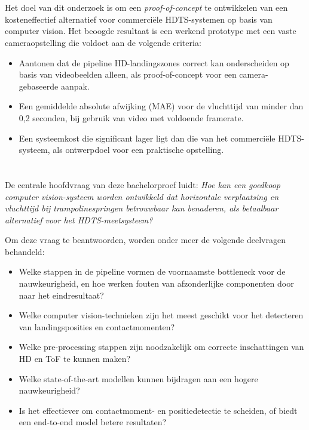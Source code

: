\section{}%
\label{sec:onderzoeksdoelstelling}

Het doel van dit onderzoek is om een \textit{proof-of-concept} te ontwikkelen van een kosteneffectief alternatief voor commerci{\"e}le HDTS-systemen op basis van computer vision. Het beoogde resultaat is een werkend prototype met een vaste cameraopstelling die voldoet aan de volgende criteria:
\begin{itemize}
    \item Aantonen dat de pipeline HD-landingszones correct kan onderscheiden op basis van videobeelden alleen, als proof-of-concept voor een camera-gebaseerde aanpak.
    \item Een gemiddelde absolute afwijking (MAE) voor de vluchttijd van minder dan 0,2 seconden, bij gebruik van video met voldoende framerate.
    \item Een systeemkost die significant lager ligt dan die van het commerci{\"e}le HDTS-systeem, als ontwerpdoel voor een praktische opstelling.
\end{itemize}

\section{}%
\label{sec:onderzoeksvraag}

De centrale hoofdvraag van deze bachelorproef luidt: 
\textit{Hoe kan een goedkoop computer vision-systeem worden ontwikkeld dat horizontale verplaatsing en vluchttijd bij trampolinespringen betrouwbaar kan benaderen, als betaalbaar alternatief voor het HDTS-meetsysteem?}

Om deze vraag te beantwoorden, worden onder meer de volgende deelvragen behandeld:
\begin{itemize}
    \item Welke stappen in de pipeline vormen de voornaamste bottleneck voor de nauwkeurigheid, en hoe werken fouten van afzonderlijke componenten door naar het eindresultaat?
    \item Welke computer vision-technieken zijn het meest geschikt voor het detecteren van landingsposities en contactmomenten? %
    \item Welke pre-processing stappen zijn noodzakelijk om correcte inschattingen van HD en ToF te kunnen maken?
    \item Welke state-of-the-art modellen kunnen bijdragen aan een hogere nauwkeurigheid? %
    \item Is het effectiever om contactmoment- en positiedetectie te scheiden, of biedt een end-to-end model betere resultaten?
\end{itemize}

